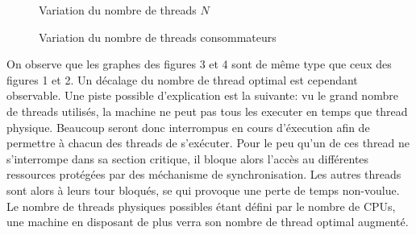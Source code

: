 \documentclass[11pt,a4paper]{article}
\begin{document}
\begin{figure}[ht!]
 \centering
 \caption{Variation du nombre de threads $N$}
 \label{schemefig1}
\end{figure}

\begin{figure}[ht!]
 \centering
 \begin{center}
 \end{center}
 \caption{Variation du nombre de threads consommateurs}
 \label{scheme1}
\end{figure}

On observe que les graphes des figures 3 et 4 sont de même type que ceux des figures 1 et 2. Un décalage du nombre de thread optimal est cependant observable. Une piste possible d'explication est la suivante: vu le grand nombre de threads utilisés, la machine ne peut pas tous les executer en temps que thread physique. Beaucoup seront donc interrompus en cours d'éxecution afin de permettre à chacun des threads de s'exécuter. Pour le peu qu'un de ces thread ne s'interrompe dans sa section critique, il bloque alors l'accès au différentes ressources protégées par des méchanisme de synchronisation. Les autres threads sont alors à leurs tour bloqués, se qui provoque une perte de temps non-voulue. Le nombre de threads physiques possibles étant défini par le nombre de CPUs, une machine en disposant de plus verra son nombre de thread optimal augmenté.
\end{document}
